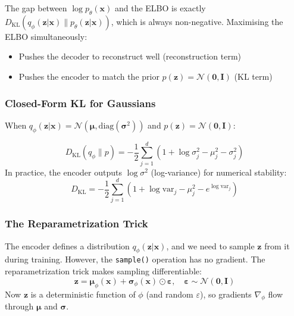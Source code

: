 \documentclass[11pt,a4paper]{article}
\begin{document}
The gap between $\log p_\theta(\mathbf{x})$ and the ELBO is exactly $D_{\mathrm{KL}}(q_\phi(\mathbf{z}|\mathbf{x}) \| p_\theta(\mathbf{z}|\mathbf{x}))$, which is always non-negative. Maximising the ELBO simultaneously:
\begin{itemize}
    \item Pushes the decoder to reconstruct well (reconstruction term)
    \item Pushes the encoder to match the prior $p(\mathbf{z}) = \mathcal{N}(\mathbf{0}, \mathbf{I})$ (KL term)
\end{itemize}

\subsubsection{Closed-Form KL for Gaussians}

When $q_\phi(\mathbf{z}|\mathbf{x}) = \mathcal{N}(\boldsymbol{\mu}, \mathrm{diag}(\boldsymbol{\sigma}^2))$ and $p(\mathbf{z}) = \mathcal{N}(\mathbf{0}, \mathbf{I})$:

\begin{concept}
\[
D_{\mathrm{KL}}\left(q_\phi \| p\right) = -\frac{1}{2} \sum_{j=1}^{d} \left(1 + \log \sigma_j^2 - \mu_j^2 - \sigma_j^2\right)
\]
In practice, the encoder outputs $\log \sigma^2$ (log-variance) for numerical stability:
\[
D_{\mathrm{KL}} = -\frac{1}{2} \sum_{j=1}^{d} \left(1 + \log\text{var}_j - \mu_j^2 - e^{\log\text{var}_j}\right)
\]
\end{concept}

\subsubsection{The Reparametrization Trick}

\begin{concept}
The encoder defines a distribution $q_\phi(\mathbf{z}|\mathbf{x})$, and we need to sample $\mathbf{z}$ from it during training. However, the \texttt{sample()} operation has no gradient. The reparametrization trick makes sampling differentiable:
\[
\mathbf{z} = \boldsymbol{\mu}_\phi(\mathbf{x}) + \boldsymbol{\sigma}_\phi(\mathbf{x}) \odot \boldsymbol{\varepsilon}, \quad \boldsymbol{\varepsilon} \sim \mathcal{N}(\mathbf{0}, \mathbf{I})
\]
Now $\mathbf{z}$ is a deterministic function of $\phi$ (and random $\varepsilon$), so gradients $\nabla_\phi$ flow through $\boldsymbol{\mu}$ and $\boldsymbol{\sigma}$.
\end{concept}
\end{document}
